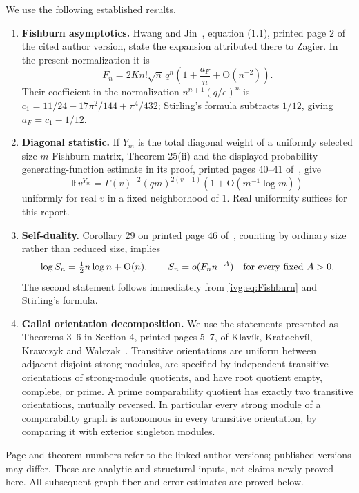 \documentclass[11pt,letterpaper]{article}
\theoremstyle{definition}\newtheorem{definition}[theorem]{Definition}
\theoremstyle{remark}\newtheorem{remark}[theorem]{Remark}
\newcommand{\OO}{\mathrm O}
\newcommand{\E}{\mathbb E}
\begin{document}
We use the following established results.
\begin{enumerate}
\item \textbf{Fishburn asymptotics.} Hwang and Jin~\cite{HJ}, equation (1.1), printed page 2 of the cited author version, state the expansion attributed there to Zagier. In the present normalization it is
\begin{equation}\label{ivg:eq:Fishburn}
 F_n=2K n!\sqrt n\,q^n\left(1+\frac{a_F}{n}+\OO(n^{-2})\right).
\end{equation}
Their coefficient in the normalization $n^{n+1}(q/e)^n$ is
$c_1=11/24-17\pi^2/144+\pi^4/432$; Stirling's formula subtracts $1/12$, giving $a_F=c_1-1/12$.
\item \textbf{Diagonal statistic.} If $Y_m$ is the total diagonal weight of a uniformly selected size-$m$ Fishburn matrix, Theorem 25(ii) and the displayed probability-generating-function estimate in its proof, printed pages 40--41 of~\cite{HJ}, give
\begin{equation}\label{ivg:eq:pgf}
 \E v^{Y_m}=\Gamma(v)^{-2}(qm)^{2(v-1)}
 \left(1+\OO(m^{-1}\log m)\right)
\end{equation}
uniformly for real $v$ in a fixed neighborhood of 1. Real uniformity suffices for this report.
\item \textbf{Self-duality.} Corollary 29 on printed page 46 of~\cite{HJ}, counting by ordinary size rather than reduced size, implies
\begin{equation}\label{ivg:eq:selfdual}
 \log S_n=\tfrac12n\log n+\OO(n),\qquad
 S_n=o(F_n n^{-A})\quad\hbox{for every fixed }A>0.
\end{equation}
The second statement follows immediately from \eqref{ivg:eq:Fishburn} and Stirling's formula.
\item \textbf{Gallai orientation decomposition.} We use the statements presented as Theorems 3--6 in Section 4, printed pages 5--7, of Klav\'ik, Kratochv\'il, Krawczyk and Walczak~\cite{Gallai}. Transitive orientations are uniform between adjacent disjoint strong modules, are specified by independent transitive orientations of strong-module quotients, and have root quotient empty, complete, or prime. A prime comparability quotient has exactly two transitive orientations, mutually reversed. In particular every strong module of a comparability graph is autonomous in every transitive orientation, by comparing it with exterior singleton modules.
\end{enumerate}
Page and theorem numbers refer to the linked author versions; published versions may differ. These are analytic and structural inputs, not claims newly proved here. All subsequent graph-fiber and error estimates are proved below.
\end{document}
